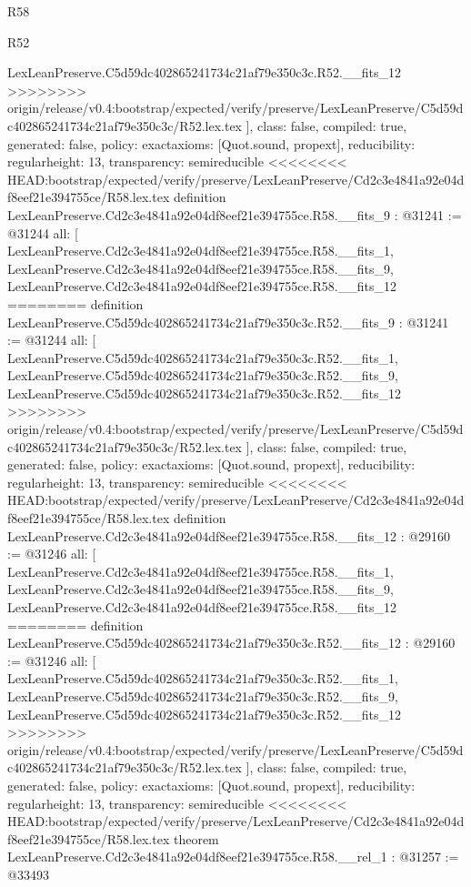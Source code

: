 \begin{lexlean}{R58}
\begin{lexlean}{R52}
\begin{coremodule}
{{{{{{{{{{{{{{{{{{{{{{{{{{{{{{{{{{{{{{{{{{{{{{{{{{{{{{{{{{{{{{{{{{{{{{{{{{{{{{{{{{{{{{{{{{{{{{{{{{{{{{{{{{{{{{{{{{{{{{{{{{{{{{{{{{{{{{{{{{{{{{{{{{{{{{    LexLeanPreserve.C5d59dc402865241734c21af79e350c3c.R52.__fits_12
>>>>>>>> origin/release/v0.4:bootstrap/expected/verify/preserve/LexLeanPreserve/C5d59dc402865241734c21af79e350c3c/R52.lex.tex
  ],
  class: false,
  compiled: true,
  generated: false,
  policy: exact{axioms: [Quot.sound, propext]},
  reducibility: regular{height: 13},
  transparency: semireducible
}
<<<<<<<< HEAD:bootstrap/expected/verify/preserve/LexLeanPreserve/Cd2c3e4841a92e04df8eef21e394755ce/R58.lex.tex
definition LexLeanPreserve.Cd2c3e4841a92e04df8eef21e394755ce.R58.__fits_9 : @31241 := @31244 {
  all: [
    LexLeanPreserve.Cd2c3e4841a92e04df8eef21e394755ce.R58.__fits_1,
    LexLeanPreserve.Cd2c3e4841a92e04df8eef21e394755ce.R58.__fits_9,
    LexLeanPreserve.Cd2c3e4841a92e04df8eef21e394755ce.R58.__fits_12
========
definition LexLeanPreserve.C5d59dc402865241734c21af79e350c3c.R52.__fits_9 : @31241 := @31244 {
  all: [
    LexLeanPreserve.C5d59dc402865241734c21af79e350c3c.R52.__fits_1,
    LexLeanPreserve.C5d59dc402865241734c21af79e350c3c.R52.__fits_9,
    LexLeanPreserve.C5d59dc402865241734c21af79e350c3c.R52.__fits_12
>>>>>>>> origin/release/v0.4:bootstrap/expected/verify/preserve/LexLeanPreserve/C5d59dc402865241734c21af79e350c3c/R52.lex.tex
  ],
  class: false,
  compiled: true,
  generated: false,
  policy: exact{axioms: [Quot.sound, propext]},
  reducibility: regular{height: 13},
  transparency: semireducible
}
<<<<<<<< HEAD:bootstrap/expected/verify/preserve/LexLeanPreserve/Cd2c3e4841a92e04df8eef21e394755ce/R58.lex.tex
definition LexLeanPreserve.Cd2c3e4841a92e04df8eef21e394755ce.R58.__fits_12 : @29160 := @31246 {
  all: [
    LexLeanPreserve.Cd2c3e4841a92e04df8eef21e394755ce.R58.__fits_1,
    LexLeanPreserve.Cd2c3e4841a92e04df8eef21e394755ce.R58.__fits_9,
    LexLeanPreserve.Cd2c3e4841a92e04df8eef21e394755ce.R58.__fits_12
========
definition LexLeanPreserve.C5d59dc402865241734c21af79e350c3c.R52.__fits_12 : @29160 := @31246 {
  all: [
    LexLeanPreserve.C5d59dc402865241734c21af79e350c3c.R52.__fits_1,
    LexLeanPreserve.C5d59dc402865241734c21af79e350c3c.R52.__fits_9,
    LexLeanPreserve.C5d59dc402865241734c21af79e350c3c.R52.__fits_12
>>>>>>>> origin/release/v0.4:bootstrap/expected/verify/preserve/LexLeanPreserve/C5d59dc402865241734c21af79e350c3c/R52.lex.tex
  ],
  class: false,
  compiled: true,
  generated: false,
  policy: exact{axioms: [Quot.sound, propext]},
  reducibility: regular{height: 13},
  transparency: semireducible
}
<<<<<<<< HEAD:bootstrap/expected/verify/preserve/LexLeanPreserve/Cd2c3e4841a92e04df8eef21e394755ce/R58.lex.tex
theorem LexLeanPreserve.Cd2c3e4841a92e04df8eef21e394755ce.R58.__rel_1 : @31257 := @33493 {
}}}}}}}}}}}}}}}}}}}}}}}}}}}}}}}}}}}}}}}}}}}}}}}}}}}}}}}}}}}}}}}}}}}}}}}}}}}}}}}}}}}}}}}}}}}}}}}}}}}}}}}}}}}}}}}}}}}}}}}}}}}}}}}}}}}}}}}}}}}}}}}}}}}}}}}}
\end{coremodule}
\end{lexlean}
\end{lexlean}
